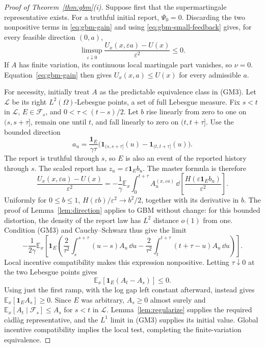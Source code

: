 \documentclass[12pt]{article}
\newcommand{\E}{\mathbb{E}}
\begin{document}
\begin{proof}[Proof of Theorem~\ref{thm:gbm}(i)]
Suppose first that the supermartingale representative exists. For a
truthful initial report, \(\Psi_0=0\). Discarding the two
nonpositive terms in \eqref{eq:gbm-gain} and using
\eqref{eq:gbm-small-feedback} gives, for every feasible direction
\((0,a)\),
\[
  \limsup_{\varepsilon\downarrow0}
  \frac{U_x(x,\varepsilon a)-U(x)}{\varepsilon^2}
  \leq0.
\]
If \(A\) has finite variation, its continuous local martingale part
vanishes, so \(\nu=0\). Equation~\eqref{eq:gbm-gain} then gives
\(U_x(x,a)\leq U(x)\) for every admissible \(a\).

For necessity, initially treat \(A\) as the predictable equivalence
class in (GM3). Let \(\mathcal L\) be its right
\(L^2(\Omega)\)-Lebesgue points, a set of full Lebesgue measure.
Fix \(s<t\) in \(\mathcal L\), \(E\in\mathcal F_s\), and
\(0<\tau<(t-s)/2\). Let \(b\) rise linearly from zero to one on
\((s,s+\tau]\), remain one until \(t\), and fall linearly to zero
on \((t,t+\tau]\). Use the bounded direction
\[
  a_u=\frac{\mathbf1_E}{\gamma\tau}
       \bigl(\mathbf1_{(s,s+\tau]}(u)
             -\mathbf1_{(t,t+\tau]}(u)\bigr).
\]
The report is truthful through \(s\), so \(E\) is also an event
of the reported history through \(s\). The scaled report has
\(z_u=\varepsilon\mathbf1_Eb_u\). The master formula is therefore
\[
  \frac{U_x(x,\varepsilon a)-U(x)}{\varepsilon^2}
  =-\frac1\gamma\E_x\int_0^{t+\tau} A_u^{(x,\varepsilon a)}
      \,\dd\!\left[
        \frac{H(\varepsilon\mathbf1_Eb_u)}{\varepsilon^2}
      \right].
\]
Uniformly for \(0\leq b\leq1\),
\(H(\varepsilon b)/\varepsilon^2\to b^2/2\), together with its
derivative in \(b\). The proof of Lemma~\ref{lem:direction} applies
to GBM without change: for this bounded distortion, the density of
the report law has \(L^2\) distance \(o(1)\) from one. Condition
(GM3) and Cauchy--Schwarz thus give the limit
\[
  -\frac1{2\gamma}\E_x\!\left[
    \mathbf1_E\left(
      \frac2{\tau^2}\int_s^{s+\tau}(u-s)A_u\,\dd u
      -\frac2{\tau^2}\int_t^{t+\tau}(t+\tau-u)A_u\,\dd u
    \right)\right].
\]
Local incentive compatibility makes this expression nonpositive.
Letting \(\tau\downarrow0\) at the two Lebesgue points gives
\[
  \E_x[\mathbf1_E(A_t-A_s)]\leq0.
\]
Using just the first ramp, with the log gap left constant afterward,
instead gives \(\E_x[\mathbf1_EA_s]\geq0\). Since \(E\) was
arbitrary, \(A_s\geq0\) almost surely and
\(\E_x[A_t\mid\mathcal F_s]\leq A_s\) for \(s<t\) in
\(\mathcal L\). Lemma~\ref{lem:regularize} supplies the required
c\`adl\`ag representative, and the \(L^1\) limit in (GM3) supplies
its initial value. Global incentive compatibility implies the local
test, completing the finite-variation equivalence.
\end{proof}
\end{document}
